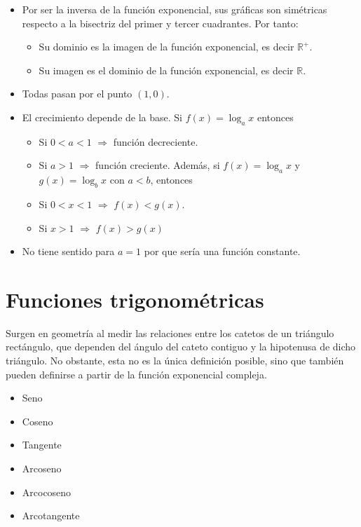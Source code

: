 \documentclass[
  a4paper,
]{scrreport}
\providecommand{\tightlist}{%
  \setlength{\itemsep}{0pt}\setlength{\parskip}{0pt}}\usepackage{longtable,booktabs,array}
\theoremstyle{plain}
\theoremstyle{plain}
\theoremstyle{definition}
\theoremstyle{definition}
\theoremstyle{plain}
\theoremstyle{remark}
\begin{document}
\begin{itemize}
\tightlist
\item
  Por ser la inversa de la función exponencial, sus gráficas son
  simétricas respecto a la bisectriz del primer y tercer cuadrantes. Por
  tanto:

  \begin{itemize}
  \tightlist
  \item
    Su dominio es la imagen de la función exponencial, es decir
    \(\mathbb{R}^+\).
  \item
    Su imagen es el dominio de la función exponencial, es decir
    \(\mathbb{R}\).
  \end{itemize}
\item
  Todas pasan por el punto \((1,0)\).
\item
  El crecimiento depende de la base. Si \(f(x)=\log_a x\) entonces

  \begin{itemize}
  \tightlist
  \item
    Si \(0<a<1\) \(\Rightarrow\) función decreciente.
  \item
    Si \(a>1\) \(\Rightarrow\) función creciente. Además, si
    \(f(x)=\log_a x\) y \(g(x)=\log_b x\) con \(a<b\), entonces
  \item
    Si \(0<x<1\) \(\Rightarrow\) \(f(x)<g(x)\).
  \item
    Si \(x>1\) \(\Rightarrow\) \(f(x)>g(x)\)
  \end{itemize}
\item
  No tiene sentido para \(a=1\) por que sería una función constante.
\end{itemize}

\hypertarget{funciones-trigonomuxe9tricas}{%
\section{Funciones trigonométricas}\label{funciones-trigonomuxe9tricas}}

Surgen en geometría al medir las relaciones entre los catetos de un
triángulo rectángulo, que dependen del ángulo del cateto contiguo y la
hipotenusa de dicho triángulo. No obstante, esta no es la única
definición posible, sino que también pueden definirse a partir de la
función exponencial compleja.

\begin{itemize}
\tightlist
\item
  Seno
\item
  Coseno
\item
  Tangente
\item
  Arcoseno
\item
  Arcocoseno
\item
  Arcotangente
\end{itemize}
\end{document}
